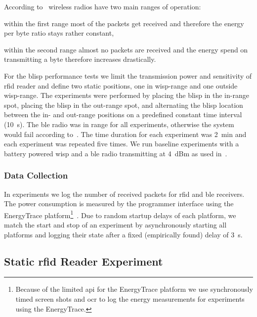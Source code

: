 \documentclass[conference,letterpaper,twoside,final,10pt]{IEEEtran}
\begin{document}
According to~ wireless radios have two main ranges of operation:
\begin{enumerate*}[label=(\roman*)]
	\item 	within the first range most of the packets get received and therefore the energy per byte ratio stays rather constant,
	\item 	within the second range almost no packets are received and the energy spend on transmitting a byte therefore increases drastically.
\end{enumerate*}
For the \ac{blisp} performance tests we limit the transmission power and sensitivity of \ac{rfid} reader and define two static positions, one in \ac{wisp}-range and one outside \ac{wisp}-range.
The experiments were performed by placing the \ac{blisp} in the in-range spot, placing the \ac{blisp} in the out-range spot, and alternating the \ac{blisp} location between the in- and out-range positions on a predefined constant time interval (\SI{10}{\second}).
The \ac{ble} radio was in range for all experiments, otherwise the system would fail according to~.
The time duration for each experiment was \SI{2}{\minute} and each experiment was repeated five times.
We run baseline experiments with a battery powered \ac{wisp} and a \ac{ble} radio transmitting at \SI{4}{dBm} as used in~.

\subsubsection{Data Collection}

In experiments we log the number of received packets for \ac{rfid} and \ac{ble} receivers.
The power consumption is measured by the programmer interface using the EnergyTrace platform\footnote{Because of the limited \ac{api} for the EnergyTrace platform we use synchronously timed screen shots and \ac{ocr} to log the energy measurements for experiments using the EnergyTrace.}~\cite{ti2015energytrace}.
Due to random startup delays of each platform, we match the start and stop of an experiment by asynchronously starting all platforms and logging their state after a fixed (empirically found) delay of \SI{3}{\second}.

\subsection{Static \acs{rfid} Reader Experiment}
\label{sec:experiments/results}
\end{document}
